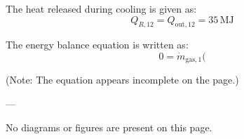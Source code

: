 The heat released during cooling is given as:  
\[
Q_{R,12} = Q_{\text{out},12} = 35 \, \text{MJ}
\]  

The energy balance equation is written as:  
\[
0 = \dot{m}_{\text{gas},1}(
\]  

(Note: The equation appears incomplete on the page.)  

---

No diagrams or figures are present on this page.